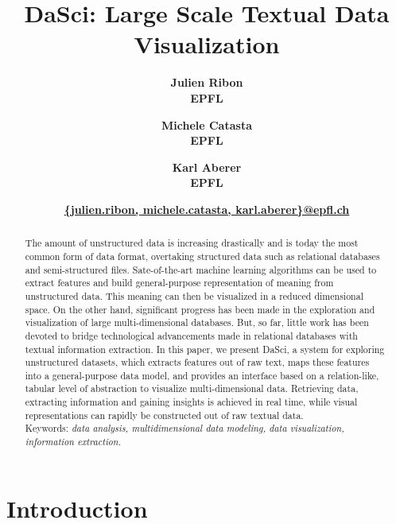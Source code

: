 \documentclass[10pt, a4paper, twocolumn]{article} %
\title{\vspace{-15mm}\fontsize{18pt}{10pt}\selectfont\textbf{DaSci: Large Scale Textual Data Visualization}} %
\author{
  \textbf{Julien Ribon}\\
  \textbf{EPFL}
  \and
  \textbf{Michele Catasta}\\
  \textbf{EPFL}
  \and
  \textbf{Karl Aberer}\\
  \textbf{EPFL}
  \and
  \href{mailto:julien.ribon@epfl.ch}{\textbf{\{julien.ribon, michele.catasta, karl.aberer\}@epfl.ch}}
}
\date{}
\begin{document}
\maketitle %




\begin{abstract}

The amount of unstructured data is increasing drastically and is today the most common form of data format, overtaking structured data such as relational databases and semi-structured files.
Sate-of-the-art machine learning algorithms can be used to extract features and build general-purpose representation of meaning from unstructured data. This meaning can then be visualized in a reduced dimensional space.
On the other hand, significant progress has been made in the exploration and visualization of large multi-dimensional databases.
But, so far, little work has been devoted to bridge technological advancements made in relational databases with textual information extraction.
In this paper, we present DaSci, a system for exploring unstructured datasets, which extracts features out of raw text, maps these features into a general-purpose data model, and provides an interface based on a relation-like, tabular level of abstraction to visualize multi-dimensional data.
Retrieving data, extracting information and gaining insights is achieved in real time, while visual representations can rapidly be constructed out of raw textual data. \\

Keywords:
\textit{data analysis, multidimensional data modeling, data visualization, information extraction.}


\end{abstract}



\section{Introduction}
\label{section:introduction}
\end{document}
